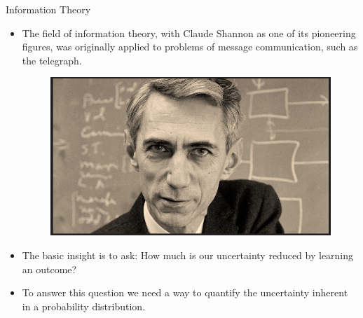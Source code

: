 \documentclass[handout]{beamer}
\begin{document}
\begin{frame}{Information Theory}
\scriptsize{

\begin{itemize}

\item  The field of information theory, with Claude Shannon as one of its pioneering figures, was originally applied to problems of message communication, such as the telegraph.

\begin{figure}[h!]
	\centering
	\includegraphics[scale=0.2]{pics/shannon.png}
\end{figure}

\item The basic insight is to ask: How much is our uncertainty reduced by learning an outcome?


\item To answer this question we need a way to quantify the uncertainty inherent in a probability distribution.

\end{itemize}


} 
\end{frame}
\end{document}
